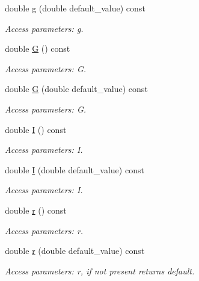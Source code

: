 \begin{DoxyCompactItemize}
double \hyperlink{struct_d_d4hep_1_1_x_m_l_1_1_dimension_a4a319c6728e414c3932ab56c70f6e238}{g} (double default\+\_\+value) const
\begin{DoxyCompactList}\small\item\em Access parameters\+: g. \end{DoxyCompactList}\item 
double \hyperlink{struct_d_d4hep_1_1_x_m_l_1_1_dimension_a7439fec443cacdd47697acf7680d3190}{G} () const
\begin{DoxyCompactList}\small\item\em Access parameters\+: G. \end{DoxyCompactList}\item 
double \hyperlink{struct_d_d4hep_1_1_x_m_l_1_1_dimension_a855a8722c86aff07bcd75390b0e62cd5}{G} (double default\+\_\+value) const
\begin{DoxyCompactList}\small\item\em Access parameters\+: G. \end{DoxyCompactList}\item 
double \hyperlink{struct_d_d4hep_1_1_x_m_l_1_1_dimension_a2086e55444457dda316cc842ffdb33e0}{I} () const
\begin{DoxyCompactList}\small\item\em Access parameters\+: I. \end{DoxyCompactList}\item 
double \hyperlink{struct_d_d4hep_1_1_x_m_l_1_1_dimension_a932e2af0c0e9f3853816a2972e06c909}{I} (double default\+\_\+value) const
\begin{DoxyCompactList}\small\item\em Access parameters\+: I. \end{DoxyCompactList}\item 
double \hyperlink{struct_d_d4hep_1_1_x_m_l_1_1_dimension_acfae1ef6199f2de4af8dddec4a0baf4f}{r} () const
\begin{DoxyCompactList}\small\item\em Access parameters\+: r. \end{DoxyCompactList}\item 
double \hyperlink{struct_d_d4hep_1_1_x_m_l_1_1_dimension_a47baaee7e4c15170a176d3c12d571fea}{r} (double default\+\_\+value) const
\begin{DoxyCompactList}\small\item\em Access parameters\+: r, if not present returns default. \end{DoxyCompactList}\item 

\end{DoxyCompactItemize}
